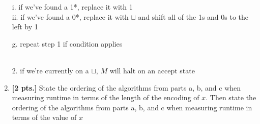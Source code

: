 \documentclass[11pt]{article}
\theoremstyle{definition}
\theoremstyle{theorem}
\newcommand{\solution}{\medskip\noindent{\color{blue}\textbf{Solution:}}}
\begin{document}
\begin{enumerate}[label=(\alph*)]
\begin{minipage}{0.9\textwidth}
\begin{minipage}{1.2\textwidth}
	\begin{minipage}{1.2\textwidth}
		i. if we've found a 1*, replace it with 1 \\
		ii. if we've found a 0*, replace it with $\sqcup$ and shift all of the 1s and 0s to the left by 1 \\
	\end{minipage}
	g. repeat step 1 if condition applies \\~\\
\end{minipage}
2. if we're currently on a $\sqcup$, $M$ will halt on an accept state  
\end{minipage}



\item \textbf{[2 pts.]} State the ordering of the algorithms from parts a, b, and c when measuring runtime in terms of the length of the encoding of $x$. Then state the ordering of the algorithms from parts a, b, and c when measuring runtime in terms of the value of $x$

\solution




\end{enumerate}
\end{document}
